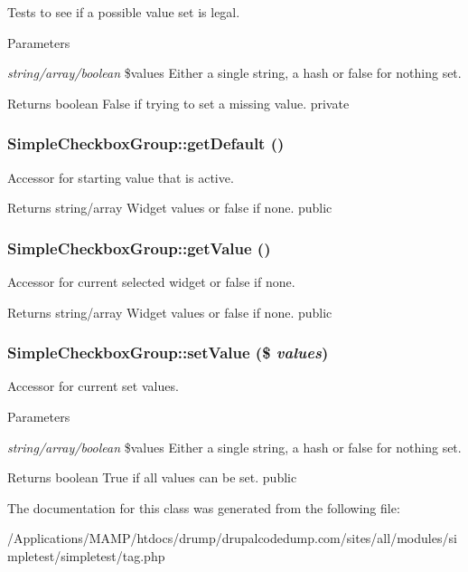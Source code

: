 \label{class_simple_checkbox_group_a7502967bd2c4adc191d9d1e8d1a7e8db}
Tests to see if a possible value set is legal. 
\begin{DoxyParams}{Parameters}
\item[{\em string/array/boolean}]\$values Either a single string, a hash or false for nothing set. \end{DoxyParams}
\begin{DoxyReturn}{Returns}
boolean False if trying to set a missing value.  private 
\end{DoxyReturn}
\hypertarget{class_simple_checkbox_group_afa20a2b8f875b255b3c87a71772221b6}{
\subsubsection[{getDefault}]{\setlength{\rightskip}{0pt plus 5cm}SimpleCheckboxGroup::getDefault ()}}
\label{class_simple_checkbox_group_afa20a2b8f875b255b3c87a71772221b6}
Accessor for starting value that is active. \begin{DoxyReturn}{Returns}
string/array Widget values or false if none.  public 
\end{DoxyReturn}
\hypertarget{class_simple_checkbox_group_a6b1347f1de590501b5ffe6c832c6ce3e}{
\subsubsection[{getValue}]{\setlength{\rightskip}{0pt plus 5cm}SimpleCheckboxGroup::getValue ()}}
\label{class_simple_checkbox_group_a6b1347f1de590501b5ffe6c832c6ce3e}
Accessor for current selected widget or false if none. \begin{DoxyReturn}{Returns}
string/array Widget values or false if none.  public 
\end{DoxyReturn}
\hypertarget{class_simple_checkbox_group_a62af0724806496a31c75ffe0dc06d5b0}{
\subsubsection[{setValue}]{\setlength{\rightskip}{0pt plus 5cm}SimpleCheckboxGroup::setValue (\$ {\em values})}}
\label{class_simple_checkbox_group_a62af0724806496a31c75ffe0dc06d5b0}
Accessor for current set values. 
\begin{DoxyParams}{Parameters}
\item[{\em string/array/boolean}]\$values Either a single string, a hash or false for nothing set. \end{DoxyParams}
\begin{DoxyReturn}{Returns}
boolean True if all values can be set.  public 
\end{DoxyReturn}


The documentation for this class was generated from the following file:\begin{DoxyCompactItemize}
\item 
/Applications/MAMP/htdocs/drump/drupalcodedump.com/sites/all/modules/simpletest/simpletest/tag.php\end{DoxyCompactItemize}
